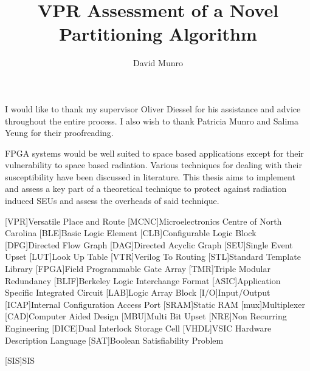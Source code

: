 \documentclass[12pt,final,oneside]{dwThesis} %
\title{VPR Assessment of a Novel Partitioning Algorithm}
\author{David Munro}
\begin{document}
   \maketitle
   \begin{acknowledgements}
      I would like to thank my supervisor Oliver Diessel for his assistance and advice throughout the entire process. I also wish to thank Patricia Munro and Salima Yeung for their proofreading.

   \end{acknowledgements}
   \begin{abstracts}
      \ac{FPGA} systems would be well suited to space based applications except for their vulnerability to space based radiation. Various techniques for dealing with their susceptibility have been discussed in literature. This thesis aims to implement and assess a key part of a theoretical technique to protect against radiation induced \acp{SEU} and assess the overheads of said technique.
      \acresetall
   \end{abstracts}
   \newpage
   \tableofcontents*
   \listoffixmes
   \newpage

   \begin{acronym}
      [VPR]{Versatile Place and Route}
      [MCNC]{Microelectronics Centre of North Carolina}
      [BLE]{Basic Logic Element}
      [CLB]{Configurable Logic Block}
      [DFG]{Directed Flow Graph}
      [DAG]{Directed Acyclic Graph}
      [SEU]{Single Event Upset}
      [LUT]{Look Up Table}
      [VTR]{Verilog To Routing}
      [STL]{Standard Template Library}
      [FPGA]{Field Programmable Gate Array}
      [TMR]{Triple Modular Redundancy}
      [BLIF]{Berkeley Logic Interchange Format}
      [ASIC]{Application Specific Integrated Circuit}
      [LAB]{Logic Array Block}
      [I/O]{Input/Output}
      [ICAP]{Internal Configuration Access Port}
      [SRAM]{Static RAM}
      [mux]{Multiplexer}
      [CAD]{Computer Aided Design}
      [MBU]{Multi Bit Upset}
      [NRE]{Non Recurring Engineering}
      [DICE]{Dual Interlock Storage Cell}
      [VHDL]{VSIC Hardware Description Language}
      [SAT]{Boolean Satisfiability Problem}

      [SIS]{SIS}
   \end{acronym}
\end{document}
